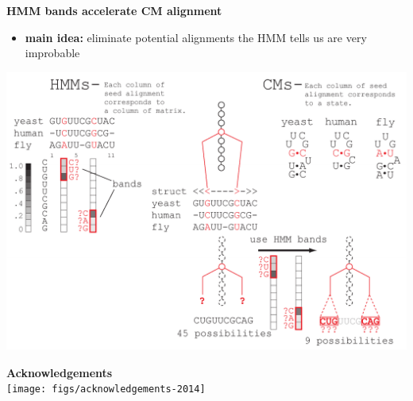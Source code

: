 \documentclass[landscape]{slides}
\begin{document}
\begin{slide}
\begin{center}

\textbf{HMM bands accelerate CM alignment}
\end{center}
\medskip
\small
\begin{itemize}
\item
\textbf{main idea:} eliminate potential alignments the HMM tells us are very improbable
\end{itemize}
\begin{center}
\includegraphics[width=8in]{figs/post_hmm_to_cm_map2_layer16}
\end{center}
\vfill
\end{slide}
\begin{slide}

\large
\begin{center}
\large{\textbf{Acknowledgements}} \\


\texttt{[image: figs/acknowledgements-2014]}

\end{center}

\vfill
\end{slide}
\end{document}
